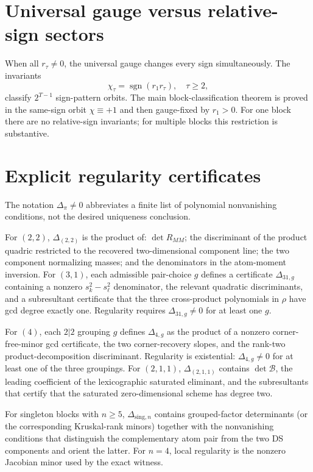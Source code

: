 \documentclass[11pt]{article}
\theoremstyle{definition}
\theoremstyle{remark}
\begin{document}
\section{Universal gauge versus relative-sign sectors}

When all $r_\tau\neq0$, the universal gauge changes every sign simultaneously. The invariants
\[
\chi_\tau=\operatorname{sgn}(r_1r_\tau),\quad \tau\ge2,
\]
classify $2^{T-1}$ sign-pattern orbits. The main block-classification theorem is proved in the same-sign orbit $\chi\equiv+1$ and then gauge-fixed by $r_1>0$. For one block there are no relative-sign invariants; for multiple blocks this restriction is substantive.

\section{Explicit regularity certificates}
\label{app:regularity}

The notation $\Delta_\pi\neq0$ abbreviates a finite list of polynomial nonvanishing conditions, not the desired uniqueness conclusion.

For $(2,2)$, $\Delta_{(2,2)}$ is the product of: $\det R_{MM}$; the discriminant of the product quadric restricted to the recovered two-dimensional component line; the two component normalizing masses; and the denominators in the atom-moment inversion. For $(3,1)$, each admissible pair-choice $g$ defines a certificate $\Delta_{31,g}$ containing a nonzero $s_k^2-s_\ell^2$ denominator, the relevant quadratic discriminants, and a subresultant certificate that the three cross-product polynomials in $\rho$ have gcd degree exactly one. Regularity requires $\Delta_{31,g}\neq0$ for at least one $g$.

For $(4)$, each $2|2$ grouping $g$ defines $\Delta_{4,g}$ as the product of a nonzero corner-free-minor gcd certificate, the two corner-recovery slopes, and the rank-two product-decomposition discriminant. Regularity is existential: $\Delta_{4,g}\neq0$ for at least one of the three groupings. For $(2,1,1)$, $\Delta_{(2,1,1)}$ contains $\det\mathcal B$, the leading coefficient of the lexicographic saturated eliminant, and the subresultants that certify that the saturated zero-dimensional scheme has degree two.

For singleton blocks with $n\ge5$, $\Delta_{\mathrm{sing},n}$ contains grouped-factor determinants (or the corresponding Kruskal-rank minors) together with the nonvanishing conditions that distinguish the complementary atom pair from the two DS components and orient the latter. For $n=4$, local regularity is the nonzero Jacobian minor used by the exact witness.
\end{document}
